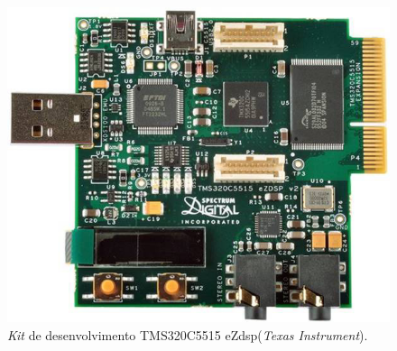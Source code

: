 \newpage

\begin{figure}[h]
	\centering
	\includegraphics[scale=0.45]{figuras/DSP.jpg}
	\caption{\textit{Kit} de desenvolvimento TMS320C5515 eZdsp(\textit{Texas Instrument}).}
	\label{dsp}
\end{figure}